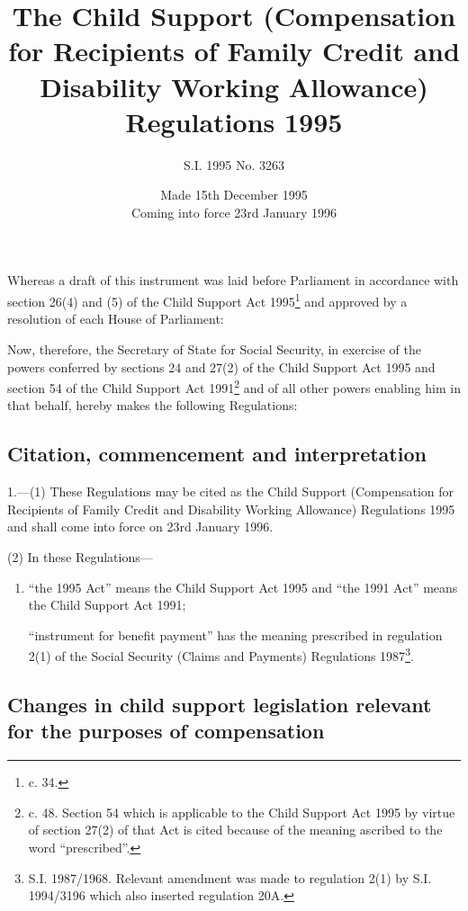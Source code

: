 \documentclass[a4paper]{article}
\title{The Child Support (Compensation for Recipients of Family Credit and Disability Working Allowance) Regulations 1995}
\author{S.I. 1995 No. 3263}
\date{Made 15th December 1995\\Coming into force 23rd January 1996
}
\begin{document}
\maketitle

\noindent
Whereas a draft of this instrument was laid before Parliament in accordance with section 26(4) and (5) of the Child Support Act 1995\footnote{ c. 34.} and approved by a resolution of each House of Parliament:

 Now, therefore, the Secretary of State for Social Security, in exercise of the powers conferred by sections 24 and 27(2) of the Child Support Act 1995 and section 54 of the Child Support Act 1991\footnote{ c. 48. Section 54 which is applicable to the Child Support Act 1995 by virtue of section 27(2) of that Act is cited because of the meaning ascribed to the word “prescribed”.} and of all other powers enabling him in that behalf, hereby makes the following Regulations:

{\sloppy

\tableofcontents

}

\setcounter{secnumdepth}{-2}

\subsection[1. Citation, commencement and interpretation]{Citation, commencement and interpretation}

1.—(1) These Regulations may be cited as the Child Support (Compensation for Recipients of Family Credit and Disability Working Allowance) Regulations 1995 and shall come into force on 23rd January 1996.

(2) In these Regulations—
\begin{enumerate}\item[]
“the 1995 Act” means the Child Support Act 1995 and “the 1991 Act” means the Child Support Act 1991;

“instrument for benefit payment” has the meaning prescribed in regulation 2(1) of the Social Security (Claims and Payments) Regulations 1987\footnote{\frenchspacing S.I. 1987/1968. Relevant amendment was made to regulation 2(1) by S.I. 1994/3196 which also inserted regulation 20A.}.
\end{enumerate}

\subsection[2. Changes in child support legislation relevant for the purposes of compensation]{Changes in child support legislation relevant for the purposes of compensation}
\end{document}
